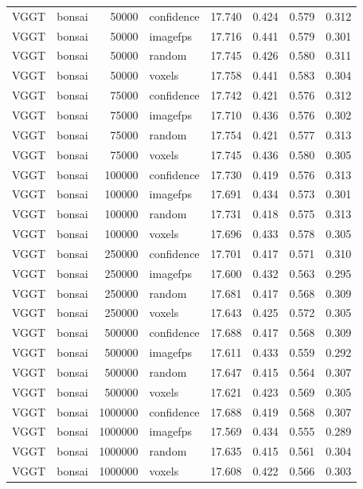 \begin{table}[H]
\begin{tabular}{llrlrrrr}
VGGT & bonsai & 50000 & confidence & 17.740 & 0.424 & 0.579 & 0.312 \\
VGGT & bonsai & 50000 & imagefps & 17.716 & 0.441 & 0.579 & 0.301 \\
VGGT & bonsai & 50000 & random & 17.745 & 0.426 & 0.580 & 0.311 \\
VGGT & bonsai & 50000 & voxels & 17.758 & 0.441 & 0.583 & 0.304 \\
VGGT & bonsai & 75000 & confidence & 17.742 & 0.421 & 0.576 & 0.312 \\
VGGT & bonsai & 75000 & imagefps & 17.710 & 0.436 & 0.576 & 0.302 \\
VGGT & bonsai & 75000 & random & 17.754 & 0.421 & 0.577 & 0.313 \\
VGGT & bonsai & 75000 & voxels & 17.745 & 0.436 & 0.580 & 0.305 \\
VGGT & bonsai & 100000 & confidence & 17.730 & 0.419 & 0.576 & 0.313 \\
VGGT & bonsai & 100000 & imagefps & 17.691 & 0.434 & 0.573 & 0.301 \\
VGGT & bonsai & 100000 & random & 17.731 & 0.418 & 0.575 & 0.313 \\
VGGT & bonsai & 100000 & voxels & 17.696 & 0.433 & 0.578 & 0.305 \\
VGGT & bonsai & 250000 & confidence & 17.701 & 0.417 & 0.571 & 0.310 \\
VGGT & bonsai & 250000 & imagefps & 17.600 & 0.432 & 0.563 & 0.295 \\
VGGT & bonsai & 250000 & random & 17.681 & 0.417 & 0.568 & 0.309 \\
VGGT & bonsai & 250000 & voxels & 17.643 & 0.425 & 0.572 & 0.305 \\
VGGT & bonsai & 500000 & confidence & 17.688 & 0.417 & 0.568 & 0.309 \\
VGGT & bonsai & 500000 & imagefps & 17.611 & 0.433 & 0.559 & 0.292 \\
VGGT & bonsai & 500000 & random & 17.647 & 0.415 & 0.564 & 0.307 \\
VGGT & bonsai & 500000 & voxels & 17.621 & 0.423 & 0.569 & 0.305 \\
VGGT & bonsai & 1000000 & confidence & 17.688 & 0.419 & 0.568 & 0.307 \\
VGGT & bonsai & 1000000 & imagefps & 17.569 & 0.434 & 0.555 & 0.289 \\
VGGT & bonsai & 1000000 & random & 17.635 & 0.415 & 0.561 & 0.304 \\
VGGT & bonsai & 1000000 & voxels & 17.608 & 0.422 & 0.566 & 0.303 \\

\end{tabular}
\end{table}
